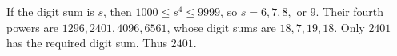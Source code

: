 If the digit sum is $s$, then $1000\le s^4\le9999$, so $s=6,7,8,$ or $9$. Their fourth powers are $1296,2401,4096,6561$, whose digit sums are $18,7,19,18$. Only $2401$ has the required digit sum. Thus $\boxed{2401}$.
